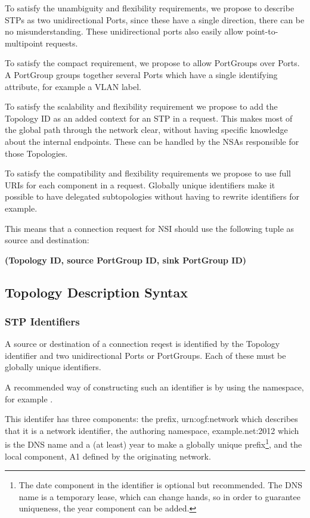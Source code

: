 \documentclass{article}
\begin{document}
 To satisfy the unambiguity and flexibility requirements, we propose 
to describe STPs as two unidirectional Ports, since these have a single direction, 
there can be no misunderstanding. These unidirectional ports also easily allow 
point-to-multipoint requests.

 To satisfy the compact requirement, we propose to allow PortGroups 
over Ports. A PortGroup groups together several Ports which have a single identifying 
attribute, for example a VLAN label.

 To satisfy the scalability and flexibility requirement we propose 
to add the Topology ID as an added context for an STP in a request. This makes 
most of the global path through the network clear, without having specific knowledge 
about the internal endpoints. These can be handled by the NSAs responsible for 
those Topologies.

 To satisfy the compatibility and flexibility requirements we propose 
to use full URIs for each component in a request. Globally unique identifiers make 
it possible to have delegated subtopologies without having to rewrite identifiers 
for example.


 This means that a connection request for NSI should use the following 
tuple as source and destination:

 \textbf{(Topology ID, source PortGroup ID, sink PortGroup ID)}


\subsection{Topology Description Syntax}


\subsubsection{STP Identifiers}

 A source or destination of a connection reqest is identified by 
the Topology identifier and two unidirectional Ports or PortGroups. Each of these 
must be globally unique identifiers.

 A recommended way of constructing such an identifier is by using 
the  namespace, for example .

 This identifer has three components: the prefix, urn:ogf:network 
which describes that it is a network identifier, the authoring namespace, example.net:2012 
which is the DNS name and a (at least) year to make a globally unique prefix\footnote{  
The date component in the identifier is optional but recommended. The DNS name 
is a temporary lease, which can change hands, so in order to guarantee uniqueness, 
the year component can be added.}, and the local component, A1 defined by the originating 
network. \label{h.nk6ov0u4wctm}
\end{document}

